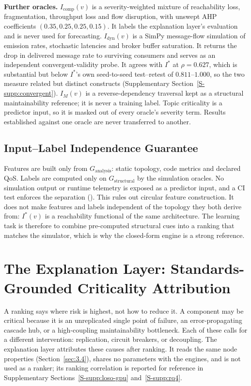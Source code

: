 \documentclass[preprint,3p]{elsarticle}
\begin{document}
\noindent\textbf{Further oracles.} $I_{\text{comp}}(v)$ is a severity-weighted mixture of reachability loss, fragmentation, throughput loss and flow disruption, with unswept AHP coefficients $(0.35, 0.25, 0.25, 0.15)$. It labels the explanation layer's evaluation and is never used for forecasting. $I_{\text{dyn}}(v)$ is a SimPy \cite{team2020simpy} message-flow simulation of emission rates, stochastic latencies and broker buffer saturation. It returns the drop in delivered message rate to surviving consumers and serves as an independent convergent-validity probe. It agrees with $I^*$ at $\rho = 0.627$, which is substantial but below $I^*$'s own seed-to-seed test--retest of $0.811$--$1.000$, so the two measure related but distinct constructs (Supplementary Section~\ref{S-supp:convergent}). $I_M(v)$ is a reverse-dependency traversal kept as a structural maintainability reference; it is never a training label. Topic criticality is a predictor input, so it is masked out of every oracle's severity term. Results established against one oracle are never transferred to another.

\subsection{Input--Label Independence Guarantee}
\label{sec:4.4}

Features are built only from $G_{\text{analysis}}$: static topology, code metrics and declared QoS. Labels are computed only on $G_{\text{structural}}$ by the simulation oracles. No simulation output or runtime telemetry is exposed as a predictor input, and a CI test enforces the separation (). This rules out circular feature construction. It does not make features and labels independent of the topology they both derive from: $I^*(v)$ is a reachability functional of the same architecture. The learning task is therefore to combine pre-computed structural cues into a ranking that matches the simulator, which is why the closed-form engine is a strong reference.

\section{The Explanation Layer: Standards-Grounded Criticality Attribution}
\label{sec:5}

A ranking says where risk is highest, not how to reduce it. A component may be critical because it is an unreplicated single point of failure, an error-propagating cascade hub, or a high-coupling maintainability bottleneck. Each of these calls for a different intervention: replication, circuit breakers, or decoupling. The explanation layer attributes these causes after ranking. It reads the same node properties (Section~\ref{sec:3.4}), shares no parameters with the engines, and is not used as a ranker; its ranking correlation is reported for reference in Supplementary Sections~\ref{S-supp:loso-gpu} and~\ref{S-supp:rq4}.
\end{document}
